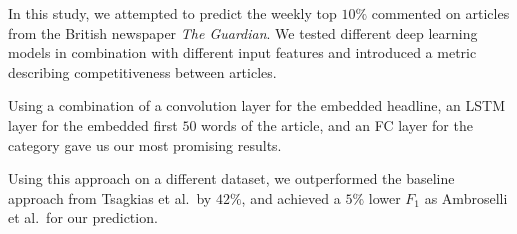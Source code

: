 In this study, we attempted to predict the weekly top $10\%$ commented on articles from the British newspaper \textit{The Guardian}. 
We tested different deep learning models in combination with different input features and introduced a metric describing competitiveness between articles.

Using a combination of a convolution layer for the embedded headline, an LSTM layer for the embedded first $50$ words of the article, and an FC layer for the category gave us our most promising results.

Using this approach on a different dataset, we outperformed the baseline approach from Tsagkias et al.\ by $42\%$, and achieved a $5\%$ lower $F_1$ as Ambroselli et al.\ for our prediction.